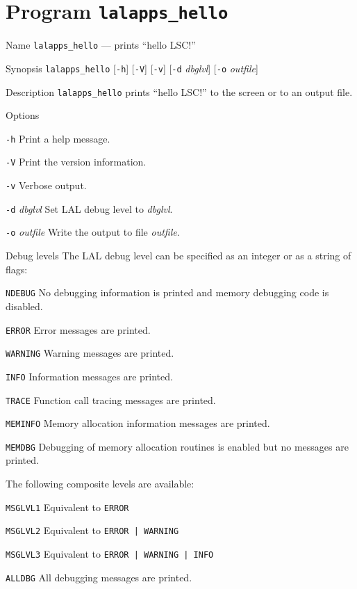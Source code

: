 \section{Program \texttt{lalapps\_hello}}
\label{program:lalapps-hello}

\begin{entry}

\item[Name]
\verb$lalapps_hello$ --- prints ``hello LSC!''

\item[Synopsis]
\verb$lalapps_hello$ [\verb$-h$] [\verb$-V$] [\verb$-v$]
[\verb$-d$ \textit{dbglvl}] [\verb$-o$ \textit{outfile}]

\item[Description]
\verb$lalapps_hello$ prints ``hello LSC!'' to the screen or to an output file.

\item[Options]\leavevmode
\begin{entry}
\item[\texttt{-h}]
Print a help message.
\item[\texttt{-V}]
Print the version information.
\item[\texttt{-v}]
Verbose output.
\item[\texttt{-d} \textit{dbglvl}]
Set LAL debug level to \textit{dbglvl}.
\item[\texttt{-o} \textit{outfile}]
Write the output to file \textit{outfile}.
\end{entry}

\item[Debug levels]
The LAL debug level can be specified as an integer or as a string of flags:
\begin{entry}
\item[\texttt{NDEBUG}]
No debugging information is printed and memory debugging code is disabled.
\item[\texttt{ERROR}]
Error messages are printed.
\item[\texttt{WARNING}]
Warning messages are printed.
\item[\texttt{INFO}]
Information messages are printed.
\item[\texttt{TRACE}]
Function call tracing messages are printed.
\item[\texttt{MEMINFO}]
Memory  allocation  information messages are printed.
\item[\texttt{MEMDBG}]
Debugging of memory allocation routines is enabled but no messages are printed.
\end{entry}
The following composite levels are available:
\begin{entry}
\item[\texttt{MSGLVL1}]
Equivalent to \verb$ERROR$
\item[\texttt{MSGLVL2}]
Equivalent to \verb$ERROR | WARNING$
\item[\texttt{MSGLVL3}]
Equivalent to \verb$ERROR | WARNING | INFO$
\item[\texttt{ALLDBG}]
All debugging messages are printed.
\end{entry}


\end{entry}
